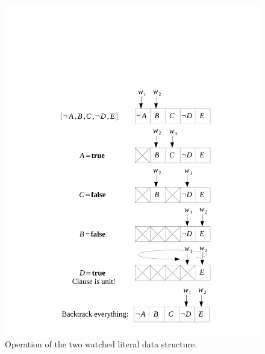 \documentclass[12pt]{diicc}
\begin{document}
\begin{figure}[h!]
	\centering
		\includegraphics[width=1.0\textwidth]{watchedliterals}
	\caption{Operation of the two watched literal data structure.}
	\label{fig:watched literals}
\end{figure}
\end{document}

